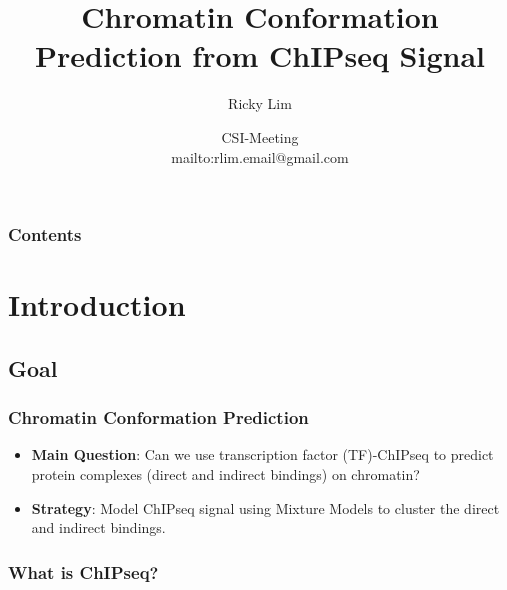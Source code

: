\documentclass[notes]{beamer}
\title{\normalsize Chromatin Conformation Prediction from ChIPseq Signal}
\author[Lim]
{Ricky Lim\inst{1}}
\institute[] 
{
    \inst{1}
    Touati Benoukraf-Lab at CSI-NUS
}
\date[22 May 2015]
{CSI-Meeting \\\tiny{mailto:rlim.email@gmail.com}}
\begin{document}
\begin{frame}
\titlepage
\end{frame}

\begin{frame}[plain]
    \frametitle{Contents}
    \tableofcontents
\end{frame}


\section{Introduction}
\subsection{Goal}
\begin{frame}
    \frametitle{Chromatin Conformation Prediction}

    \begin{itemize}[<+->]
        \item \textbf{Main Question}: 
            Can we use transcription factor (TF)-ChIPseq to predict protein complexes (direct and indirect bindings) on chromatin?
        \item \textbf{Strategy}: Model ChIPseq signal using Mixture Models to cluster the direct and indirect bindings. 
    \end{itemize}

\end{frame}

\subsubsection{What is ChIPseq?}
\begin{frame}
\end{frame}
\end{document}
